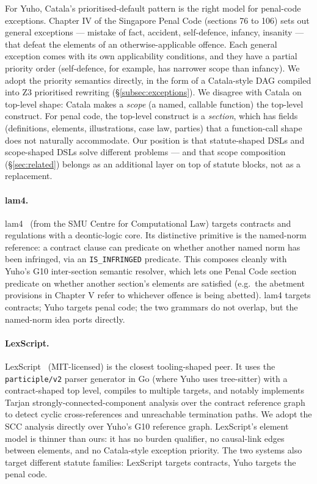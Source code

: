 For Yuho, Catala's prioritised-default pattern is the right model for
penal-code exceptions. Chapter IV of the Singapore Penal Code (sections
76 to 106) sets out general exceptions --- mistake of fact, accident,
self-defence, infancy, insanity --- that defeat the elements of an
otherwise-applicable offence. Each general exception comes with its own
applicability conditions, and they have a partial priority order
(self-defence, for example, has narrower scope than infancy). We adopt
the priority semantics directly, in the form of a Catala-style DAG
compiled into Z3 prioritised rewriting (\S\ref{subsec:exceptions}). We
disagree with Catala on top-level shape: Catala makes a \emph{scope} (a
named, callable function) the top-level construct. For penal code, the
top-level construct is a \emph{section}, which has fields (definitions,
elements, illustrations, case law, parties) that a function-call shape
does not naturally accommodate. Our position is that statute-shaped
DSLs and scope-shaped DSLs solve different problems --- and that scope
composition (\S\ref{sec:related}) belongs as an additional layer on
top of statute blocks, not as a replacement.

\paragraph{lam4.} lam4~\cite{lam4} (from the SMU Centre for Computational
Law) targets contracts and regulations with a deontic-logic core. Its
distinctive primitive is the named-norm reference: a contract clause
can predicate on whether another named norm has been infringed, via an
\texttt{IS\_INFRINGED} predicate. This composes cleanly with Yuho's
\textsf{G10} inter-section semantic resolver, which lets one Penal Code section
predicate on whether another section's elements are satisfied (e.g.\ the
abetment provisions in Chapter V refer to whichever offence is being
abetted). lam4 targets contracts; Yuho targets penal code; the two
grammars do not overlap, but the named-norm idea ports directly.

\paragraph{LexScript.} LexScript~\cite{lexscript} (MIT-licensed) is
the closest tooling-shaped peer. It uses the \texttt{participle/v2}
parser generator in Go (where Yuho uses tree-sitter) with a
contract-shaped top level, compiles to multiple targets, and notably
implements Tarjan strongly-connected-component analysis over the
contract reference graph to detect cyclic cross-references and
unreachable termination paths. We adopt the SCC analysis directly
over Yuho's \textsf{G10} reference graph. LexScript's element model is thinner
than ours: it has no burden qualifier, no causal-link edges
between elements, and no Catala-style exception priority. The two
systems also target different statute families: LexScript targets
contracts, Yuho targets the penal code.

